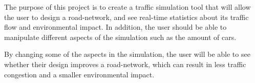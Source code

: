 
The purpose of this project is to create a traffic simulation tool that will allow the user to design a road-network, and see real-time statistics about its traffic flow and environmental impact. In addition, the user should be able to manipulate different aspects of the simulation such as the amount of cars. 

 By changing some of the aspects in the simulation, the user will be able to see whether their design improves a road-network, which can result in less traffic congestion and a smaller environmental impact.